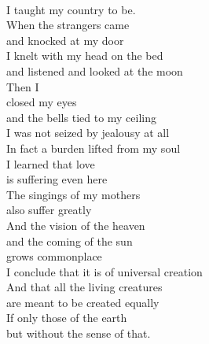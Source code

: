 \documentclass[smalldemyvopaper,11pt,twoside,onecolumn,openright,extrafontsizes]{memoir}
\begin{document}
\\I taught my country to be.
\\When the strangers came
\\and knocked at my door
\\I knelt with my head on the bed
\\and listened and looked at the moon
\\Then I
\\closed my eyes
\\and the bells tied to my ceiling
\\I was not seized by jealousy at all
\\In fact a burden lifted from my soul
\\I learned that love
\\is suffering even here
\\The singings of my mothers
\\also suffer greatly
\\And the vision of the heaven
\\and the coming of the sun
\\grows commonplace
\\I conclude that it is of universal creation
\\And that all the living creatures
\\are meant to be created equally
\\If only those of the earth
\\but without the sense of that.
\end{document}
